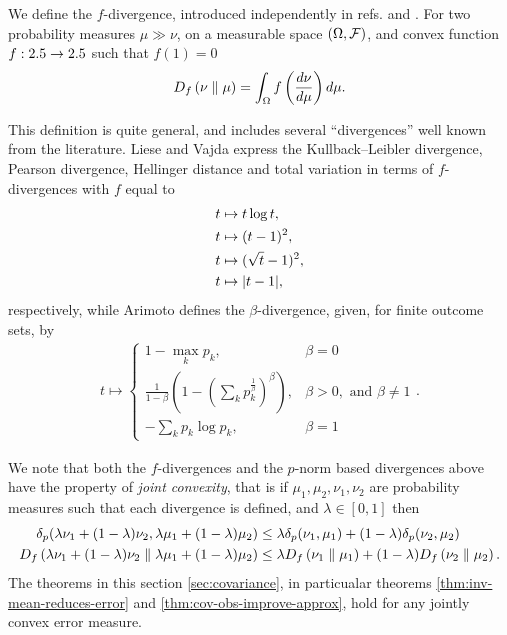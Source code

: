 We define the $f$-divergence, introduced independently in refs. \cite{10.2307/2984279} and \cite{der1964informationstheoretische}. For two probability measures $\mu\gg\nu$, on a measurable space $(\Omega, \mathcal{F})$, and convex function $f:2.5\to2.5$ such that $f(1) = 0$
\begin{align}\label{eqn:f-div-defn}
  D_{f}\left({\nu}\parallel{\mu}\right) = \int_\Omega f\left(\frac{d\nu}{d\mu}\right) d\mu.
\end{align}

This definition is quite general, and includes several ``divergences'' well known from the literature. Liese and Vajda \cite{1705001g} express the Kullback–Leibler divergence, Pearson divergence, Hellinger distance and total variation in terms of $f$-divergences with $f$ equal to
\begin{align}
  t&\mapsto t\log t,\\
  t&\mapsto (t-1)^2,\\
  t&\mapsto (\sqrt{t} -1)^2,\\
  t&\mapsto {\left\lvert{t-1}\right\rvert},
\end{align}
respectively, while Arimoto defines the $\beta$-divergence, given, for finite outcome sets, by
\begin{align}
  t \mapsto \begin{cases}1-\max_k p_k, & \beta = 0\\ \frac{1}{1-\beta}\left(1- \left(\sum_k p_k^\frac{1}{\beta}\right)^\beta\right), &\beta >0, \text{ and } \beta\neq 1 \\ -\sum_k p_k \log p_k, & \beta = 1\end{cases}.
\end{align}

We note that both the $f$-divergences and the $p$-norm based divergences above have the property of \emph{joint convexity}, that is if $\mu_1, \mu_2, \nu_1,\nu_2$ are probability measures such that each divergence is defined, and $\lambda\in [0,1]$ then
\begin{align}
  \delta_p(\lambda\nu_1 + (1-\lambda)\nu_2, \lambda\mu_1 + (1-\lambda)\mu_2) &\leq \lambda \delta_p(\nu_1, \mu_1) + (1-\lambda)\delta_p(\nu_2, \mu_2)\\
  D_{f}\left({\lambda\nu_1 + (1-\lambda)\nu_2}\parallel{\lambda\mu_1 + (1-\lambda)\mu_2}\right) &\leq  \lambda D_{f}\left({\nu_1}\parallel{\mu_1}\right) + (1-\lambda)D_{f}\left({\nu_2}\parallel{\mu_2}\right).
\end{align}
The theorems in this section \ref{sec:covariance}, in particualar theorems \ref{thm:inv-mean-reduces-error} and \ref{thm:cov-obs-improve-approx}, hold for any jointly convex error measure.

